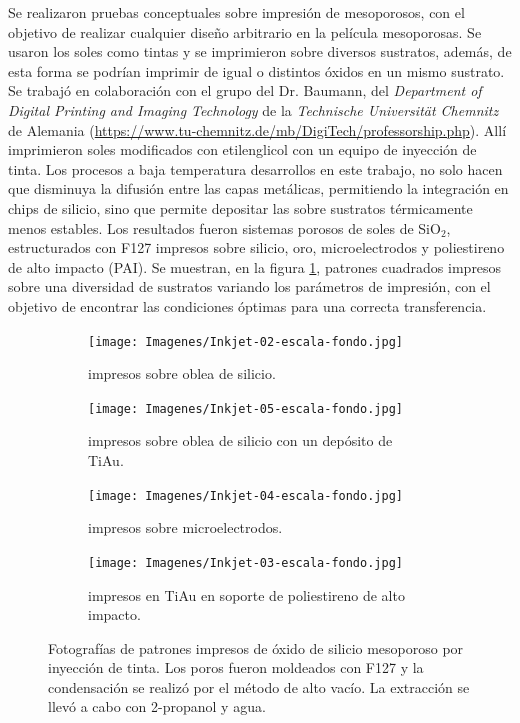 { 	  Se realizaron pruebas conceptuales sobre impresión de mesoporosos, con el objetivo de realizar cualquier diseño arbitrario en la película mesoporosas. Se usaron los soles como tintas y se imprimieron sobre diversos sustratos, además, de esta forma se podrían imprimir \pdm\space de igual o distintos óxidos en un mismo sustrato. Se trabajó en colaboración con el grupo del Dr. Baumann, del \textit{Department of Digital Printing and Imaging Technology} de la \textit{Technische Universität Chemnitz} de Alemania (\url{https://www.tu-chemnitz.de/mb/DigiTech/professorship.php}). Allí imprimieron soles modificados con etilenglicol con un equipo de inyección de tinta. Los procesos a baja temperatura desarrollos en este trabajo, no solo hacen que disminuya la difusión entre las capas metálicas, permitiendo la integración en chips de silicio, sino que permite depositar las \pdm\space sobre sustratos térmicamente menos estables. Los resultados fueron sistemas porosos de soles de SiO$_2$, estructurados con F127 impresos sobre silicio, oro, microelectrodos y poliestireno de alto impacto (PAI). Se muestran, en la figura \ref{fig:flexibles}, patrones cuadrados impresos sobre una diversidad de sustratos variando los parámetros de impresión, con el objetivo de encontrar las condiciones óptimas para una correcta transferencia.

 	  		\begin{figure}[th]
			 	   	    \centering
			 	   	    \begin{subfigure}[t]{0.495\textwidth}
			        	\texttt{[image: Imagenes/Inkjet-02-escala-fondo.jpg]}
			        	\caption{\pdmF\space impresos sobre oblea de silicio.}
			       		\end{subfigure}
			     		\centering
			     		\begin{subfigure}[t]{0.495\textwidth}
			     		\texttt{[image: Imagenes/Inkjet-05-escala-fondo.jpg]}
			    		\caption{\pdmF\space impresos sobre oblea de silicio con un depósito de Ti\textbar Au.}
			    		\end{subfigure}
			    		\centering
			    		\begin{subfigure}[t]{0.495\textwidth}
			         	\texttt{[image: Imagenes/Inkjet-04-escala-fondo.jpg]}
			        	\caption{\pdmF\space impresos sobre microelectrodos.}
			        	\end{subfigure}
			        	\centering
			        	\begin{subfigure}[t]{0.495\textwidth}
			     		\texttt{[image: Imagenes/Inkjet-03-escala-fondo.jpg]}
 			        	\caption{\pdmF\space impresos en Ti\textbar	Au en soporte de poliestireno de alto impacto.}
			        	\end{subfigure}
			     		\caption[Electrodos impresos]{Fotografías de patrones impresos de óxido de silicio mesoporoso por inyección de tinta. Los poros fueron moldeados con F127 y la condensación se realizó por el método de alto vacío. La extracción se llevó a cabo con 2-propanol y agua.}
			     		\label{fig:flexibles}
			     	   	\end{figure}
			     	  
}
